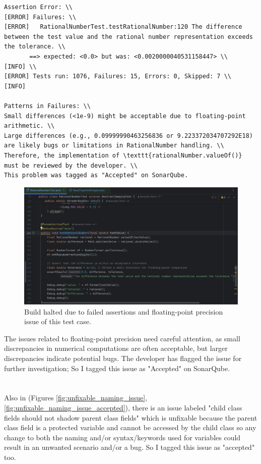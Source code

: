 \documentclass[a4paper,12pt]{report}
\begin{document}
\begin{lstlisting}
Assertion Error: \\
[ERROR] Failures: \\
[ERROR]   RationalNumberTest.testRationalNumber:120 The difference between the test value and the rational number representation exceeds the tolerance. \\
       ==> expected: <0.0> but was: <0.0020000040531158447> \\
[INFO] \\
[ERROR] Tests run: 1076, Failures: 15, Errors: 0, Skipped: 7 \\
[INFO] 

Patterns in Failures: \\
Small differences (<1e-9) might be acceptable due to floating-point arithmetic. \\
Large differences (e.g., 0.09999990463256836 or 9.223372034707292E18) are likely bugs or limitations in RationalNumber handling. \\
Therefore, the implementation of \texttt{rationalNumber.valueOf()} must be reviewed by the developer. \\
This problem was tagged as "Accepted" on SonarQube.
\end{lstlisting}

\begin{figure}[H]
    \centering
    \includegraphics[width=1\textwidth]{Report_Img/assert_fix_error.png}
    \caption{Build halted due to failed assertions and floating-point precision issue of this test case.}
    \label{fig:assertion_error}
\end{figure}

The issues related to floating-point precision need careful attention, as small discrepancies in numerical computations are often acceptable, but larger discrepancies indicate potential bugs. The developer has flagged the issue for further investigation; So I tagged this issue as "Accepted" on SonarQube.
\\
\\
\\
Also in (Figures \ref{fig:unfixable_naming_issue}, \ref{fig:unfixable_naming_issue_accepted}), there is an issue labeled "child class fields should not shadow parent class fields" which is unfixable because the parent class field is a protected variable and cannot be accessed by the child class so any change to both the naming and/or syntax/keywords used for variables could result in an unwanted scenario and/or a bug. So I tagged this issue as "accepted" too.
\end{document}
